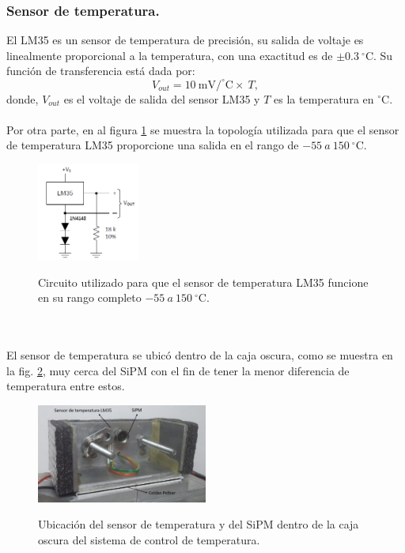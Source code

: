 \subsubsection{Sensor de temperatura.}
El LM35 es un sensor de temperatura de precisión, su salida de voltaje es linealmente proporcional a la temperatura, con una exactitud es de $ \pm 0.3 ~^\circ \mbox{C}$. Su función de transferencia está dada por:
\begin{equation}
    V_{out}=10~\mbox{mV}/^\circ \mbox{C} \times~T,
    \label{SensorTf}
\end{equation}
donde, $V_{out}$ es el voltaje de salida del sensor LM35 y $T$ es la temperatura en $^\circ \mbox{C}$.\\ \\
Por otra parte, en al figura \ref{fig:TempSense} se muestra la topología utilizada para que el sensor de temperatura LM35 proporcione una salida en el rango de $-55~a ~150~ ^\circ$C. 
\begin{figure}[h!]
\begin{centering}
    \caption{Circuito utilizado para que el sensor de temperatura LM35 funcione en su rango completo $-55~a ~150~ ^\circ \mbox{C}$.}
    \includegraphics[width=0.3\textwidth]{Images/TempSensor.png}
    \label{fig:TempSense}
  \par\end{centering}
\end{figure}
\\ \\
El sensor de temperatura se ubicó dentro de la caja oscura, como se muestra en la fig. \ref{fig:insideBox}, muy cerca del SiPM con el fin de tener la menor diferencia de temperatura entre estos.
\begin{figure}[h!]
\begin{centering}
    \caption{Ubicación del sensor de temperatura y del SiPM dentro de la caja oscura del sistema de control de temperatura.}
    \includegraphics[width=0.5\textwidth]{Images/InsideBox.png}
    \label{fig:insideBox}
  \par\end{centering}
\end{figure}
